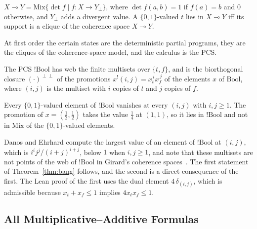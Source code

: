 \begin{theorem}
\label{thm:pcs-recipe}
$X \multimap Y = \mathrm{Mix}\{\det f \mid f : X \to Y_\bot\}$, where
$\det f(a,b) = 1$ if $f(a) = b$ and $0$ otherwise, and $Y_\bot$ adds a
divergent value. A $\{0,1\}$-valued $t$ lies in $X \multimap Y$ iff its
support is a clique of the coherence space $X \multimap Y$.
\end{theorem}

\noindent
At first order the certain states are the deterministic partial
programs, they are the cliques of the coherence-space model, and the
calculus is the PCS.

The PCS $!\mathrm{Bool}$ has web the finite
multisets over $\{t, f\}$, and is the biorthogonal closure
$(\cdot)^{\perp\perp}$ of the
promotions $x^{!}(i,j) = x_t^{\,i} x_f^{\,j}$ of the elements $x$ of
$\mathrm{Bool}$, where $(i,j)$ is the multiset with $i$ copies of $t$ and
$j$ copies of $f$.

\begin{theorem}
\label{thm:bang}
Every $\{0,1\}$-valued element of $!\mathrm{Bool}$ vanishes at every
$(i,j)$ with $i, j \ge 1$. The promotion of $x = (\tfrac12, \tfrac12)$
takes the value $\tfrac14$ at $(1,1)$, so it lies in $!\mathrm{Bool}$ and
not in $\mathrm{Mix}$ of the $\{0,1\}$-valued elements.
\end{theorem}

\noindent
Danos and Ehrhard compute the largest value of an element of
$!\mathrm{Bool}$ at $(i,j)$, which is $i^i j^j / (i+j)^{i+j}$, below $1$
when $i, j \ge 1$, and note that these multisets are not points of the web
of $!\mathrm{Bool}$ in Girard's coherence spaces~\cite{danos-ehrhard2011}.
The first statement of Theorem~\ref{thm:bang} follows, and the second is
a direct consequence of the first. The Lean proof of the first uses the
dual element $4\,\delta_{(i,j)}$, which is admissible because
$x_t + x_f \le 1$ implies $4 x_t x_f \le 1$.

\subsection{All Multiplicative--Additive Formulas}
\label{sec:recipe-mall}

